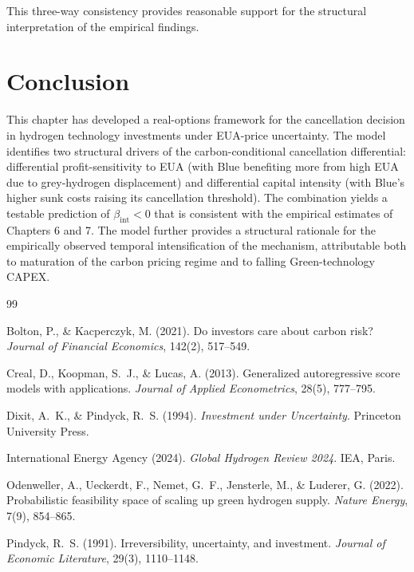 \documentclass[11pt,a4paper]{article}
\newcommand{\bint}{\beta_{\mathrm{int}}}
\begin{document}
This three-way consistency provides reasonable support for the structural interpretation of the empirical findings.

\section{Conclusion}
\label{sec:ch3-conclusion}

This chapter has developed a real-options framework for the cancellation decision in hydrogen technology investments under EUA-price uncertainty. The model identifies two structural drivers of the carbon-conditional cancellation differential: differential profit-sensitivity to EUA (with Blue benefiting more from high EUA due to grey-hydrogen displacement) and differential capital intensity (with Blue's higher sunk costs raising its cancellation threshold). The combination yields a testable prediction of $\bint < 0$ that is consistent with the empirical estimates of Chapters 6 and 7. The model further provides a structural rationale for the empirically observed temporal intensification of the mechanism, attributable both to maturation of the carbon pricing regime and to falling Green-technology CAPEX.


\begin{thebibliography}{99}

Bolton, P., \& Kacperczyk, M. (2021).
\newblock Do investors care about carbon risk?
\newblock \textit{Journal of Financial Economics}, 142(2), 517--549.

Creal, D., Koopman, S.~J., \& Lucas, A. (2013).
\newblock Generalized autoregressive score models with applications.
\newblock \textit{Journal of Applied Econometrics}, 28(5), 777--795.

Dixit, A.~K., \& Pindyck, R.~S. (1994).
\newblock \textit{Investment under Uncertainty}.
\newblock Princeton University Press.

International Energy Agency (2024).
\newblock \textit{Global Hydrogen Review 2024}.
\newblock IEA, Paris.

Odenweller, A., Ueckerdt, F., Nemet, G.~F., Jensterle, M., \& Luderer, G. (2022).
\newblock Probabilistic feasibility space of scaling up green hydrogen supply.
\newblock \textit{Nature Energy}, 7(9), 854--865.

Pindyck, R.~S. (1991).
\newblock Irreversibility, uncertainty, and investment.
\newblock \textit{Journal of Economic Literature}, 29(3), 1110--1148.

\end{thebibliography}
\end{document}
